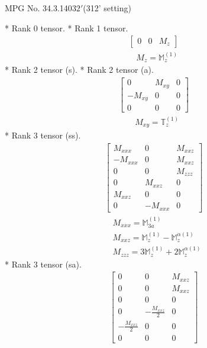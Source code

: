 \documentclass[fleqn,8pt,landscape]{jsarticle}
\begin{document}
\setcounter{MaxMatrixCols}{32}

\renewcommand{\tablename}{Table~}
\renewcommand{\figurename}{Figure~}
\begin{center}
\LARGE
MPG No. 34.3.140\quad$32'$\quad(312' setting)
\end{center}
* Rank 0 tensor.
* Rank 1 tensor.
\begin{align*}
\begin{bmatrix} 0 & 0 & M_{z} \end{bmatrix}
\end{align*}
\begin{align*}
& M_{z} = \mathbb{M}_{z}^{(1)}
\end{align*}
* Rank 2 tensor (s).
* Rank 2 tensor (a).
\begin{align*}
\begin{bmatrix} 0 & M_{xy} & 0 \\ - M_{xy} & 0 & 0 \\ 0 & 0 & 0 \end{bmatrix}
\end{align*}
\begin{align*}
& M_{xy} = \mathbb{T}_{z}^{(1)}
\end{align*}
* Rank 3 tensor (ss).
\begin{align*}
\begin{bmatrix} M_{xxx} & 0 & M_{xxz} \\ - M_{xxx} & 0 & M_{xxz} \\ 0 & 0 & M_{zzz} \\ 0 & M_{xxz} & 0 \\ M_{xxz} & 0 & 0 \\ 0 & - M_{xxx} & 0 \end{bmatrix}
\end{align*}
\begin{align*}
& M_{xxx} = \mathbb{M}_{3a}^{(1)} \\
& M_{xxz} = \mathbb{M}_{z}^{(1)} - \mathbb{M}_{z}^{\alpha(1)} \\
& M_{zzz} = 3 \mathbb{M}_{z}^{(1)} + 2 \mathbb{M}_{z}^{\alpha(1)}
\end{align*}
* Rank 3 tensor (sa).
\begin{align*}
\begin{bmatrix} 0 & 0 & M_{xxz} \\ 0 & 0 & M_{xxz} \\ 0 & 0 & 0 \\ 0 & - \frac{M_{xxz}}{2} & 0 \\ - \frac{M_{xxz}}{2} & 0 & 0 \\ 0 & 0 & 0 \end{bmatrix}
\end{align*}
\end{document}
